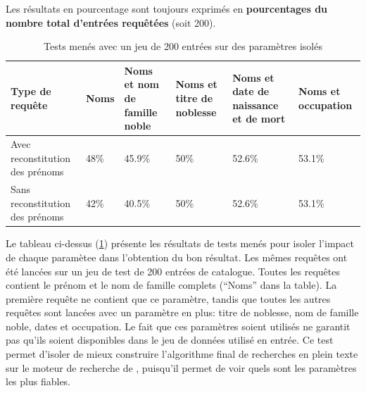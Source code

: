 Les résultats en pourcentage sont toujours exprimés en \textbf{pourcentages du nombre total d'entrées requêtées} (soit 200).
\pagebreak

\begin{table}[h]
	\centering
	\begin{tabular}{>{\centering}m{3cm}m{2cm}m{2cm}m{2cm}m{2cm}m{2cm}}
		\hline
		\textbf{Type de requête} & \textbf{Noms} & \textbf{Noms et nom de famille noble} & \textbf{Noms et titre de noblesse} & \textbf{Noms et date de naissance et de mort} & \textbf{Noms et occupation} \\
		\hline
		\hline
		Avec reconstitution des prénoms & 48\% & 45.9\% & 50\% & 52.6\% & 53.1\% \\
		\hline
		Sans reconstitution des prénoms & 42\% & 40.5\% & 50\% & 52.6\% & 53.1\% \\
		\hline	
	\end{tabular}
	\caption{Tests menés avec un jeu de 200 entrées sur des paramètres isolés}
	\label{appendix:testisolate}
\end{table}

Le tableau ci-dessus (\ref{appendix:testisolate}) présente les résultats de tests menés pour isoler l'impact de chaque paramètee dans l'obtention du bon résultat. Les mêmes requêtes ont été lancées sur un jeu de test de 200 entrées de catalogue. Toutes les requêtes contient le prénom et le nom de famille complets (\enquote{Noms} dans la table). La première requête ne contient que ce paramètre, tandis que toutes les autres requêtes sont lancées avec un paramètre en plus: titre de noblesse, nom de famille noble, dates et occupation. Le fait que ces paramètres soient utilisés ne garantit pas qu'ils soient disponibles dans le jeu de données utilisé en entrée.  Ce test permet d'isoler de mieux construire l'algorithme final de recherches en plein texte sur le moteur de recherche de \wkd{}, puisqu'il permet de voir quels sont les paramètres les plus fiables.
\vfill
\pagebreak


